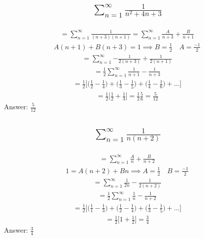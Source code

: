 \documentclass{article}
\begin{document}
\subsection{
	\begin{align*}
		\sum_{n = 1}^{\infty} \frac{1}{n^2 + 4n + 3}
	\end{align*}
}
\begin{align*}
	= \sum_{n = 1}^{\infty} {\frac{1}{(n + 3)(n + 1)}} = \sum_{n = 1}^{\infty} {\frac{A}{n + 3} + \frac{B}{n + 1}}
\end{align*}
\begin{align*}
	A(n + 1) + B(n + 3) = 1 \implies B = \frac{1}{2} \quad A = \frac{-1}{2}
\end{align*}
\begin{align*}
	= \sum_{n = 1}^{\infty} {-\frac{1}{2(n + 3)} + \frac{1}{2(n + 1)}}
\end{align*}
\begin{align*}
	= \frac{1}{2} \sum_{n = 1}^{\infty} {\frac{1}{n + 1} - \frac{1}{n + 3}}
\end{align*}
\begin{align*}
	= \frac{1}{2} \bigg[ \bigg( \frac{1}{2} - \frac{1}{4} \bigg) + \bigg( \frac{1}{3} - \frac{1}{5} \bigg) + \bigg( \frac{1}{4} - \frac{1}{6} \bigg) + ... \bigg]
\end{align*}
\begin{align*}
	= \frac{1}{2} \bigg[ \frac{1}{2} + \frac{1}{3} \bigg] = \frac{1}{2} \frac{5}{6} = \frac{5}{12}
\end{align*}
Answer: $\frac{5}{12}$

\subsection{
	\begin{align*}
		\sum_{n = 1}^{\infty} \frac{1}{n(n + 2)}
	\end{align*}
}
\begin{align*}
	= \sum_{n = 1}^{\infty} \frac{A}{n} + \frac{B}{n + 2}
\end{align*}
\begin{align*}
	1 = A(n + 2) + Bn \implies A = \frac{1}{2} \quad B = \frac{-1}{2}
\end{align*}
\begin{align*}
	= \sum_{n = 1}^{\infty} {\frac{1}{2n} - \frac{1}{2(n + 2)}}
\end{align*}
\begin{align*}
	= \frac{1}{2} \sum_{n = 1}^{\infty} {\frac{1}{n} - \frac{1}{n + 2}}
\end{align*}
\begin{align*}
	= \frac{1}{2} \bigg[ \bigg( \frac{1}{1} - \frac{1}{3} \bigg) + \bigg( \frac{1}{2} - \frac{1}{4} \bigg) + \bigg( \frac{1}{3} - \frac{1}{5} \bigg) + \dots \bigg]
\end{align*}
\begin{align*}
	= \frac{1}{2} \bigg[1 + \frac{1}{2} \bigg] = \frac{3}{4}
\end{align*}
Answer: $\frac{3}{4}$
\end{document}
